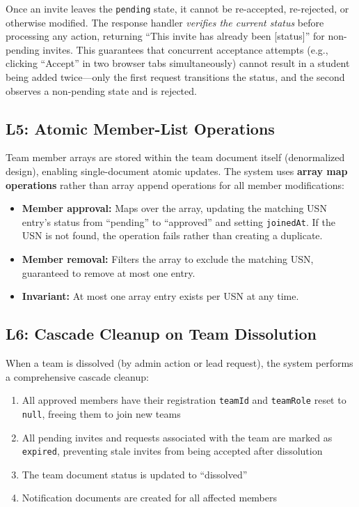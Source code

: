 \documentclass[conference]{IEEEtran}
\begin{document}
Once an invite leaves the \texttt{pending} state, it cannot be re-accepted, re-rejected, or otherwise modified. The response handler \textit{verifies the current status} before processing any action, returning ``This invite has already been [status]'' for non-pending invites. This guarantees that concurrent acceptance attempts (e.g., clicking ``Accept'' in two browser tabs simultaneously) cannot result in a student being added twice---only the first request transitions the status, and the second observes a non-pending state and is rejected.

\subsection{L5: Atomic Member-List Operations}

Team member arrays are stored within the team document itself (denormalized design), enabling single-document atomic updates. The system uses \textbf{array map operations} rather than array append operations for all member modifications:

\begin{itemize}[noitemsep,topsep=3pt]
    \item \textbf{Member approval:} Maps over the array, updating the matching USN entry's status from ``pending'' to ``approved'' and setting \texttt{joinedAt}. If the USN is not found, the operation fails rather than creating a duplicate.
    \item \textbf{Member removal:} Filters the array to exclude the matching USN, guaranteed to remove at most one entry.
    \item \textbf{Invariant:} At most one array entry exists per USN at any time.
\end{itemize}

\subsection{L6: Cascade Cleanup on Team Dissolution}

When a team is dissolved (by admin action or lead request), the system performs a comprehensive cascade cleanup:

\begin{enumerate}[noitemsep,topsep=3pt]
    \item All approved members have their registration \texttt{teamId} and \texttt{teamRole} reset to \texttt{null}, freeing them to join new teams
    \item All pending invites and requests associated with the team are marked as \texttt{expired}, preventing stale invites from being accepted after dissolution
    \item The team document status is updated to ``dissolved''
    \item Notification documents are created for all affected members
\end{enumerate}
\end{document}

